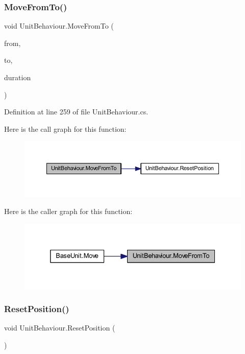 \subsubsection{\texorpdfstring{MoveFromTo()}{MoveFromTo()}}
{\footnotesize\ttfamily void Unit\+Behaviour.\+Move\+From\+To (\begin{DoxyParamCaption}\item[{Vector2\+Int}]{from,  }\item[{Vector2\+Int}]{to,  }\item[{float}]{duration }\end{DoxyParamCaption})}



Definition at line 259 of file Unit\+Behaviour.\+cs.

Here is the call graph for this function\+:
\nopagebreak
\begin{figure}[H]
\begin{center}
\leavevmode
\includegraphics[width=350pt]{class_unit_behaviour_a46ff5685dd97f930e6e2a835e01efb4d_cgraph}
\end{center}
\end{figure}
Here is the caller graph for this function\+:
\nopagebreak
\begin{figure}[H]
\begin{center}
\leavevmode
\includegraphics[width=332pt]{class_unit_behaviour_a46ff5685dd97f930e6e2a835e01efb4d_icgraph}
\end{center}
\end{figure}
\mbox{\label{class_unit_behaviour_a19e4ade6b8de90c269e3ed840d0c9f84}} 
\subsubsection{\texorpdfstring{ResetPosition()}{ResetPosition()}}
{\footnotesize\ttfamily void Unit\+Behaviour.\+Reset\+Position (\begin{DoxyParamCaption}{ }\end{DoxyParamCaption})}



